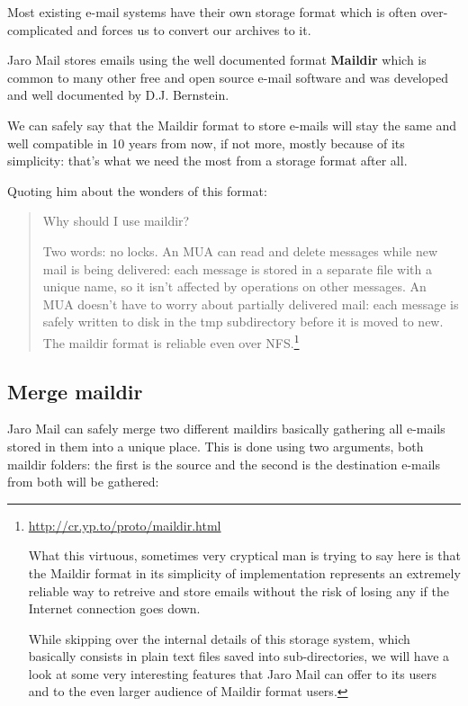 \documentclass[a4,onecolumn,portrait]{article}
\begin{document}
Most existing e-mail systems have their own storage format which is
often over-complicated and forces us to convert our archives to it.

Jaro Mail stores emails using the well documented format \textbf{Maildir}
which is common to many other free and open source e-mail software and
was developed and well documented by D.J. Bernstein.


We can safely say that the Maildir format to store e-mails will stay
the same and well compatible in 10 years from now, if not more, mostly
because of its simplicity: that's what we need the most from a storage
format after all.


Quoting him about the wonders of this format:

\begin{quote}


Why should I use maildir?

Two words: no locks. An MUA can read and delete messages while new
mail is being delivered: each message is stored in a separate file
with a unique name, so it isn't affected by operations on other
messages. An MUA doesn't have to worry about partially delivered mail:
each message is safely written to disk in the tmp subdirectory before
it is moved to new. The maildir format is reliable even over NFS.\footnote{\url{http://cr.yp.to/proto/maildir.html}

What this virtuous, sometimes very cryptical man is trying to say here
is that the Maildir format in its simplicity of implementation
represents an extremely reliable way to retreive and store emails
without the risk of losing any if the Internet connection goes down.

While skipping over the internal details of this storage system, which
basically consists in plain text files saved into sub-directories, we
will have a look at some very interesting features that Jaro Mail can
offer to its users and to the even larger audience of Maildir format
users.}
\end{quote}

\subsection{Merge maildir}
\label{sec-9-1}

Jaro Mail can safely merge two different maildirs basically gathering
all e-mails stored in them into a unique place. This is done using two
arguments, both maildir folders: the first is the source and the
second is the destination e-mails from both will be gathered:
\end{document}
